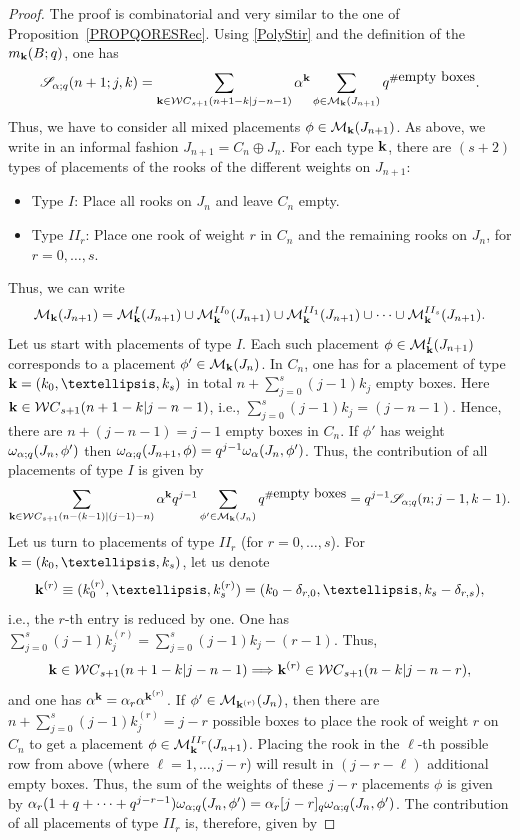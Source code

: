 \documentclass[10pt,a4paper]{amsart}
\begin{document}
\begin{proof}
The proof is combinatorial and very similar to the one of Proposition~\ref{PROPQORESRec}. Using \eqref{PolyStir} and the definition of the $m_{{\bf k}}(B;q)$, one has
$$
{\mathscr S}_{{\bf \alpha};q}(n+1;j,k)=\sum_{{\bf k} \in {\mathcal WC}_{s+1}(n+1-k|j-n-1)}{\bf  \alpha}^{{\bf k}} \sum_{\phi \in {\mathcal M}_{{\bf k}}(J_{n+1})} q^{\# \mbox{empty boxes}}.
$$ 
Thus, we have to consider all mixed placements $\phi \in \mathcal{M}_{{\bf k}}(J_{n+1})$. As above, we write in an informal fashion $J_{n+1}=C_n \oplus J_n$. For each type ${\bf k}$, there are $(s+2)$ types of placements of the rooks of the different weights on $J_{n+1}$:
\begin{itemize}
\item Type $I$: Place all rooks on $J_n$ and leave $C_n$ empty.
\item Type $II_r$: Place one rook of weight $r$ in $C_n$ and the remaining rooks on $J_{n}$, for $r=0,\ldots,s$.
\end{itemize} 
Thus, we can write
$$
\mathcal{M}_{{\bf k}}(J_{n+1})=\mathcal{M}_{{\bf k}}^{I}(J_{n+1})\cup\mathcal{M}_{{\bf k}}^{II_0}(J_{n+1})\cup\mathcal{M}_{{\bf k}}^{II_1}(J_{n+1})\cup \cdots \cup\mathcal{M}_{{\bf k}}^{II_s}(J_{n+1}).
$$
Let us start with placements of type $I$. Each such placement  $\phi  \in \mathcal{M}_{{\bf k}}^{I}(J_{n+1})$ corresponds to a placement $\phi' \in \mathcal{M}_{{\bf k}}(J_{n})$. In $C_n$, one has for a placement of type ${\bf k}=(k_0,\ldots,k_s)$ in total $n+\sum_{j=0}^s(j-1)k_j$ empty boxes. Here ${\bf k}\in {\mathcal WC}_{s+1}(n+1-k|j-n-1)$, i.e., $\sum_{j=0}^s(j-1)k_j=(j-n-1)$. Hence, there are $n+(j-n-1)=j-1$ empty boxes in $C_n$. If $\phi'$ has weight $\omega_{{\bf \alpha};q}(J_n,\phi')$ then $\omega_{{\bf \alpha};q}(J_{n+1},\phi)=q^{j-1}\omega_{{\bf \alpha}}(J_n,\phi')$. Thus, the contribution of all placements of type $I$ is given by
$$
\sum_{{\bf k} \in {\mathcal WC}_{s+1}(n-(k-1)|(j-1)-n)}{\bf  \alpha}^{{\bf k}} q^{j-1}\sum_{\phi' \in {\mathcal M}_{{\bf k}}(J_{n})} q^{\# \mbox{empty boxes}} =q^{j-1}{\mathscr S}_{{\bf \alpha};q}(n;j-1,k-1).
$$
Let us turn to placements of type $II_r$ (for $r=0,\ldots,s$). For ${\bf k}=(k_0,\ldots,k_s)$, let us denote 
$$
{\bf k}^{(r)}\equiv (k_0^{(r)},\ldots,k_{s}^{(r)})=(k_0-\delta_{r,0},\ldots,k_{s}-\delta_{r,s}), 
$$
i.e., the $r$-th entry is reduced by one. One has $\sum_{j=0}^s(j-1)k_{j}^{(r)}=\sum_{j=0}^s(j-1)k_{j}-(r-1)$. Thus, 
$$
{\bf k}\in {\mathcal WC}_{s+1}(n+1-k|j-n-1) \Longrightarrow {\bf k}^{(r)}\in {\mathcal WC}_{s+1}(n-k|j-n-r),
$$
and one has ${\bf  \alpha}^{{\bf k}}=\alpha_r{\bf  \alpha}^{{\bf k}^{(r)}}$. If $\phi' \in \mathcal{M}_{{\bf k}^{(r)}}(J_{n})$, then there are $n+\sum_{j=0}^s(j-1)k_{j}^{(r)}=j-r$ possible boxes to place the rook of weight $r$ on $C_n$ to get a placement $\phi \in \mathcal{M}_{{\bf k}}^{II_r}(J_{n+1})$. Placing the rook in the $\ell$-th possible row from above (where $\ell=1,\ldots,j-r$) will result in $(j-r-\ell)$ additional empty boxes. Thus, the sum of the weights of these $j-r$ placements $\phi$ is given by $\alpha_r (1+q+\cdots+q^{j-r-1})\omega_{{\bf \alpha};q}(J_n,\phi')=\alpha_r [j-r]_q \omega_{{\bf \alpha};q}(J_n,\phi')$. The contribution of all placements of type $II_r$ is, therefore, given by

\end{proof}
\end{document}
